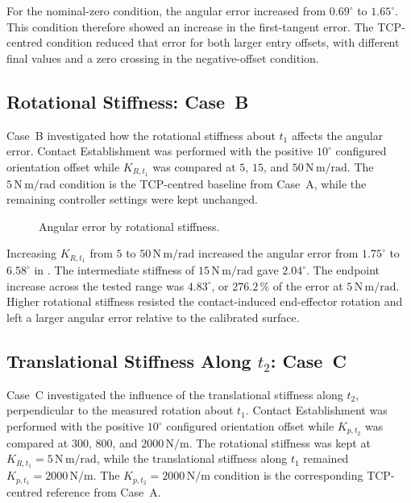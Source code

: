 For the nominal-zero condition, the angular error increased from
\mbox{\(0.69^\circ\)} to \mbox{\(1.65^\circ\)}.
This condition therefore showed an increase in the first-tangent error.
The TCP-centred condition reduced that error for both larger entry offsets,
with different final values and a zero crossing in the negative-offset
condition.

\subsection{Rotational Stiffness: Case~B}
\label{sec:results_case_b}

Case~B investigated how the rotational stiffness about \mbox{\(t_1\)}
affects the angular error. Contact Establishment was performed
with the positive \mbox{\(10^\circ\)} configured orientation offset while
\mbox{\(K_{R,t_1}\)} was compared at \mbox{\(5\)}, \mbox{\(15\)}, and
\mbox{\(50\,\mathrm{N\,m/rad}\)}. The \mbox{\(5\,\mathrm{N\,m/rad}\)}
condition is the TCP-centred baseline from Case~A, while the remaining
controller settings were kept unchanged.

\begin{figure}[H]
\centering

\caption{Angular error by rotational stiffness.}
\label{fig:results_case_b}
\end{figure}

Increasing \mbox{\(K_{R,t_1}\)} from \mbox{\(5\)} to
\mbox{\(50\,\mathrm{N\,m/rad}\)} increased the angular error from
\mbox{\(1.75^\circ\)} to \mbox{\(6.58^\circ\)} in
\mbox{}.
The intermediate stiffness of \mbox{\(15\,\mathrm{N\,m/rad}\)} gave
\mbox{\(2.04^\circ\)}.
The endpoint increase across the tested range was \mbox{\(4.83^\circ\)}, or
\mbox{\(276.2\,\%\)} of the error at \mbox{\(5\,\mathrm{N\,m/rad}\)}.
Higher rotational stiffness resisted the contact-induced end-effector rotation
and left a larger angular error relative to the calibrated surface.

\subsection{Translational Stiffness Along \texorpdfstring{\(t_2\)}{t2}: Case~C}
\label{sec:results_case_c}

Case~C investigated the influence of the translational stiffness along
\mbox{\(t_2\)}, perpendicular to the measured rotation about \mbox{\(t_1\)}.
Contact Establishment was performed with the positive \mbox{\(10^\circ\)}
configured orientation offset while \mbox{\(K_{p,t_2}\)} was compared at
\mbox{\(300\)}, \mbox{\(800\)}, and \mbox{\(2000\,\mathrm{N/m}\)}. The
rotational stiffness was kept at
\mbox{\(K_{R,t_1}=5\,\mathrm{N\,m/rad}\)}, while the translational stiffness
along \mbox{\(t_1\)} remained \mbox{\(K_{p,t_1}=2000\,\mathrm{N/m}\)}. The
\mbox{\(K_{p,t_2}=2000\,\mathrm{N/m}\)} condition is the corresponding
TCP-centred reference from Case~A.

